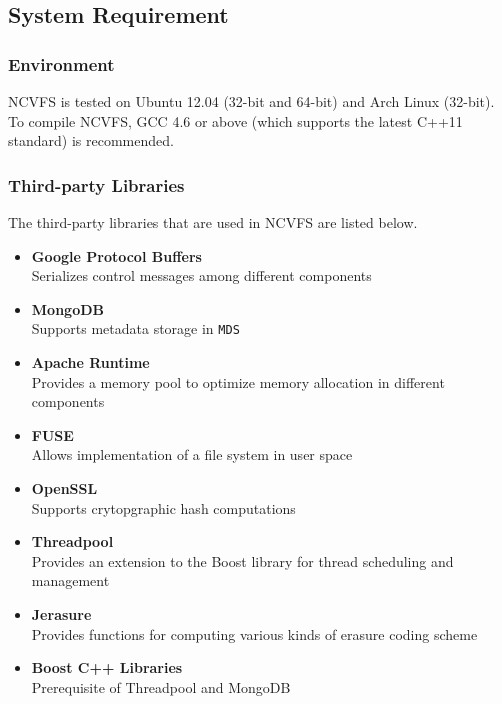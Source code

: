 \documentclass{article}
\def\mds{\texttt{MDS} }
\begin{document}
\subsection{System Requirement}

\subsubsection{Environment}

NCVFS is tested on Ubuntu 12.04 (32-bit and 64-bit) and Arch Linux (32-bit). 
To compile NCVFS, GCC 4.6 or above (which supports the latest C++11 standard) is recommended.

\subsubsection{Third-party Libraries}

The third-party libraries that are used in NCVFS are listed below.

\begin{itemize}

	\item \textbf {Google Protocol Buffers}\\
		Serializes control messages among different components
	\item \textbf {MongoDB}\\
		Supports metadata storage in \mds
	\item \textbf {Apache Runtime}\\
		Provides a memory pool to optimize memory allocation in different components
	\item \textbf {FUSE}\\
		Allows implementation of a file system in user space
	\item \textbf {OpenSSL}\\
		Supports crytopgraphic hash computations
	\item \textbf {Threadpool}\\
		Provides an extension to the Boost library for thread scheduling and management
	\item \textbf {Jerasure}\\
		Provides functions for computing various kinds of erasure coding scheme
	\item \textbf {Boost C++ Libraries}\\
		Prerequisite of Threadpool and MongoDB

\end{itemize}
\end{document}
